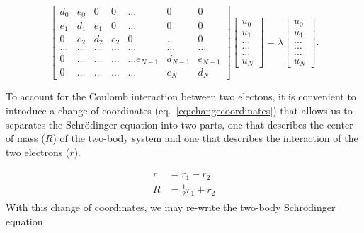 \documentclass[10pt,showpacs,preprintnumbers,footinbib,amsmath,amssymb,aps,prl,twocolumn,groupedaddress,superscriptaddress,showkeys]{revtex4-1}
\begin{document}
{\begin{equation*}
    \begin{bmatrix}d_0 & e_0 & 0   & 0    & \dots  &0     & 0 \\
                                e_1 & d_1 & e_1 & 0    & \dots  &0     &0 \\
                                0   & e_2 & d_2 & e_2  &0       &\dots & 0\\
                                \dots  & \dots & \dots & \dots  &\dots      &\dots & \dots\\
                                0   & \dots & \dots & \dots  &\dots  e_{N-1}     &d_{N-1} & e_{N-1}\\
                                0   & \dots & \dots & \dots  &\dots       &e_{N} & d_{N}
             \end{bmatrix}  \begin{bmatrix} u_{0} \\
                                                              u_{1} \\
                                                              \dots\\ \dots\\ \dots\\
                                                              u_{N}
             \end{bmatrix}=\lambda \begin{bmatrix} u_{0} \\
                                                              u_{1} \\
                                                              \dots\\ \dots\\ \dots\\
                                                              u_{N}
             \end{bmatrix}.  
\end{equation*}

To account for the Coulomb interaction between two electons, it is convenient to
introduce a change of coordinates (eq.~\ref{eq:changecoordinates}) that allows
us to separates the Schr\"{o}dinger
equation into two parts, one that describes the center of mass ($R$) of the two-body
system and one that describes the interaction of the two electrons ($r$).

\begin{align}\label{eq:changecoordinates}
\begin{split}
	r &= r_1 - r_2\\
	R &= \frac{1}{2} r_1 + r_2
\end{split}
\end{align}
With this change of coordinates, we may re-write the two-body Schr\"{o}dinger
equation

}
\end{document}
